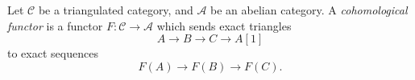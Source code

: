 
 
 
Let $\mathcal C$ be a triangulated category, and $\mathcal A$ be an abelian category.
A \emph{cohomological functor} is a functor $F: \mathcal C\to \mathcal A$ which sends exact triangles 
\[A\to B\to C\to A[1]\]
to exact sequences
\[F(A)\to F(B)\to F(C).\]

 